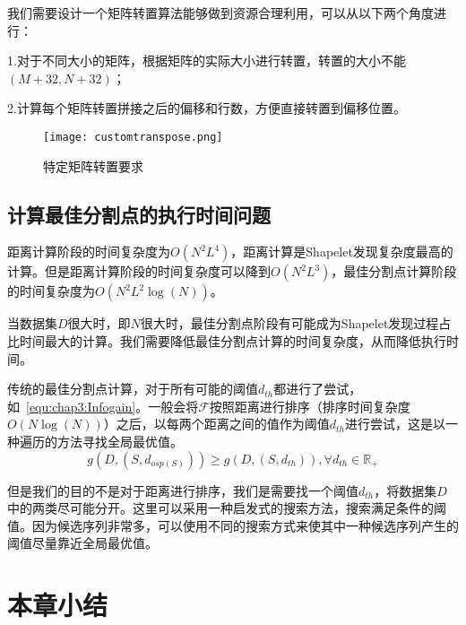 我们需要设计一个矩阵转置算法能够做到资源合理利用，可以从以下两个角度进行：

1.对于不同大小的矩阵，根据矩阵的实际大小进行转置，转置的大小不能$(M+32,N+32)$；

2.计算每个矩阵转置拼接之后的偏移和行数，方便直接转置到偏移位置。
\begin{figure}[H] %
	\centering
	\texttt{[image: customtranspose.png]}
	\caption{特定矩阵转置要求}
	\label{fig:customtranspose}
\end{figure}
\subsection{计算最佳分割点的执行时间问题}

距离计算阶段的时间复杂度为$O(N^2L^4)$，距离计算是Shapelet发现复杂度最高的计算。但是距离计算阶段的时间复杂度可以降到$O(N^2L^3)$，最佳分割点计算阶段的时间复杂度为$O(N^2L^2\log(N))$。

当数据集$D$很大时，即$N$很大时，最佳分割点阶段有可能成为Shapelet发现过程占比时间最大的计算。我们需要降低最佳分割点计算的时间复杂度，从而降低执行时间。

传统的最佳分割点计算，对于所有可能的阈值$d_{th}$都进行了尝试，如~\ref{equ:chap3:Infogain}。一般会将$\mathcal{F}$按照距离进行排序（排序时间复杂度$O(N\log(N))$）之后，以每两个距离之间的值作为阈值$d_{th}$进行尝试，这是以一种遍历的方法寻找全局最优值。
\begin{equation}
\label{equ:chap3:Infogain}
	g(D,(S,d_{osp(S)})) \geq g(D,(S,d_{th})),\forall d_{th}\in \mathbb{R}_{+}
\end{equation}

但是我们的目的不是对于距离进行排序，我们是需要找一个阈值$d_{th}$，将数据集$D$中的两类尽可能分开。这里可以采用一种启发式的搜索方法，搜索满足条件的阈值。因为候选序列非常多，可以使用不同的搜索方式来使其中一种候选序列产生的阈值尽量靠近全局最优值。

%
%
%
%
%

\section{本章小结}

